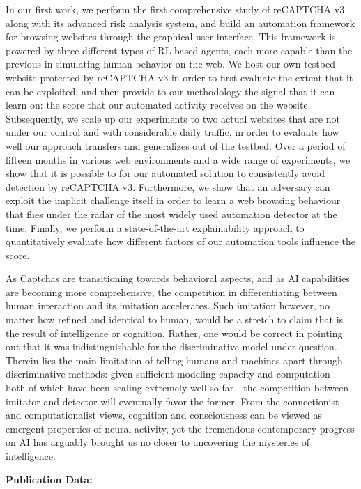 In our first work, we perform the first comprehensive study of reCAPTCHA v3 along with its advanced risk analysis system, and build an automation framework for browsing websites through the graphical user interface.
This framework is powered by three different types of RL-based agents, each more capable than the previous in simulating human behavior on the web.
We host our own testbed website protected by reCAPTCHA v3 in order to first evaluate the extent that it can be exploited, and then provide to our methodology the signal that it can learn on: the score that our automated activity receives on the website.
Subsequently, we scale up our experiments to two actual websites that are not under our control and with considerable daily traffic, in order to evaluate how well our approach transfers and generalizes out of the testbed.
Over a period of fifteen months in various web environments and a wide range of experiments, we show that it is possible to for our automated solution to consistently avoid detection by reCAPTCHA v3.
Furthermore, we show that an adversary can exploit the implicit challenge itself in order to learn a web browsing behaviour that flies under the radar of the most widely used automation detector at the time.
Finally, we perform a state-of-the-art explainability approach to quantitatively evaluate how different factors of our automation tools influence the score.

As Captchas are transitioning towards behavioral aspects, and as AI capabilities are becoming more comprehensive, the competition in differentiating between human interaction and its imitation accelerates.
Such imitation however, no matter how refined and identical to human, would be a stretch to claim that is the result of intelligence or cognition.
Rather, one would be correct in pointing out that it was indistinguishable for the discriminative model under question.
Therein lies the main limitation of telling humans and machines apart through discriminative methods: given sufficient modeling capacity and computation---both of which have been scaling extremely well so far---the competition between imitator and detector will eventually favor the former.
From the connectionist and computationalist views, cognition and consciousness can be viewed as emergent properties of neural activity, yet the tremendous contemporary progress on \gls{AI} has arguably brought us no closer to uncovering the mysteries of intelligence.

\textbf{Publication Data:} 

